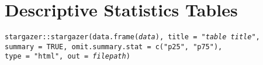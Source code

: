 \documentclass{tufte-handout}
\begin{document}
\vspace{5mm}
\section{Descriptive Statistics Tables}
\noindent \texttt{stargazer::}{\color{red}\texttt{stargazer}}\texttt{(data.frame(\textit{data}), title = "\textit{table title}", \\ summary = TRUE,  omit.summary.stat = c("p25", "p75"), \\type = "html", out = \textit{filepath})}

\end{document}
